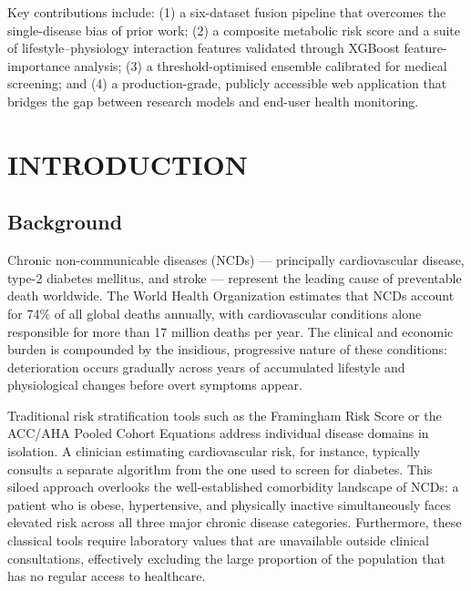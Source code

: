 \documentclass[12pt,a4paper]{report}
\begin{document}
Key contributions include: (1) a six-dataset fusion pipeline that overcomes the single-disease bias of prior work; (2) a composite metabolic risk score and a suite of lifestyle--physiology interaction features validated through XGBoost feature-importance analysis; (3) a threshold-optimised ensemble calibrated for medical screening; and (4) a production-grade, publicly accessible web application that bridges the gap between research models and end-user health monitoring.

\newpage

\tableofcontents
{}

\newpage

\listoffigures
{}

\newpage

\listoftables
{}

\newpage

\chapter{INTRODUCTION}

\section{Background}

Chronic non-communicable diseases (NCDs) — principally cardiovascular disease, type-2 diabetes mellitus, and stroke — represent the leading cause of preventable death worldwide. The World Health Organization estimates that NCDs account for 74\% of all global deaths annually, with cardiovascular conditions alone responsible for more than 17 million deaths per year. The clinical and economic burden is compounded by the insidious, progressive nature of these conditions: deterioration occurs gradually across years of accumulated lifestyle and physiological changes before overt symptoms appear.

Traditional risk stratification tools such as the Framingham Risk Score or the ACC/AHA Pooled Cohort Equations address individual disease domains in isolation. A clinician estimating cardiovascular risk, for instance, typically consults a separate algorithm from the one used to screen for diabetes. This siloed approach overlooks the well-established comorbidity landscape of NCDs: a patient who is obese, hypertensive, and physically inactive simultaneously faces elevated risk across all three major chronic disease categories. Furthermore, these classical tools require laboratory values that are unavailable outside clinical consultations, effectively excluding the large proportion of the population that has no regular access to healthcare.
\end{document}
